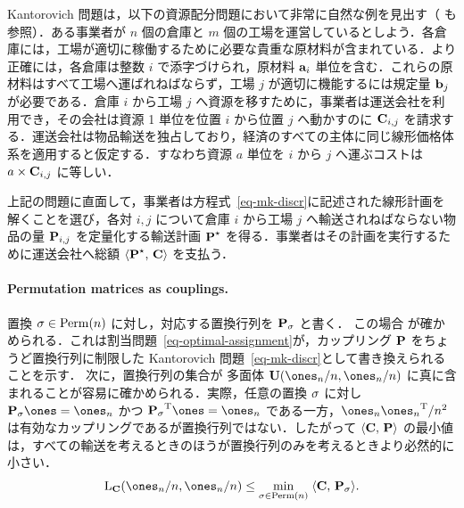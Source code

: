 \begin{rem}[鉱山と工場]\label{rem-kantorovich-primal} Kantorovich 問題は，以下の資源配分問題において非常に自然な例を見出す（\citet{Hitchcock41} も参照）．ある事業者が $n$ 個の倉庫と $m$ 個の工場を運営しているとしよう．各倉庫には，工場が適切に稼働するために必要な貴重な原材料が含まれている．より正確には，各倉庫は整数 $i$ で添字づけられ，原材料 $\a_i$ 単位を含む．これらの原材料はすべて工場へ運ばれねばならず，工場 $j$ が適切に機能するには規定量 $\b_j$ が必要である．倉庫 $i$ から工場 $j$ へ資源を移すために，事業者は運送会社を利用でき，その会社は資源 1 単位を位置 $i$ から位置 $j$ へ動かすのに $\C_{i,j}$ を請求する．運送会社は物品輸送を独占しており，経済のすべての主体に同じ線形価格体系を適用すると仮定する．すなわち資源 $a$ 単位を $i$ から $j$ へ運ぶコストは $a\times \C_{i,j}$ に等しい．

上記の問題に直面して，事業者は方程式~\eqref{eq-mk-discr}に記述された線形計画を解くことを選び，各対 $i,j$ について倉庫 $i$ から工場 $j$ へ輸送されねばならない物品の量 $\P_{i,j}$ を定量化する輸送計画 $\P^\star$ を得る．事業者はその計画を実行するために運送会社へ総額 $\dotp{\P^\star}{\C}$ を支払う．
\end{rem}

\paragraph{Permutation matrices as couplings.}

置換 $\si\in\Perm(n)$ に対し，対応する置換行列を $\P_{\si}$ と書く．
この場合
が確かめられる．これは割当問題~\eqref{eq-optimal-assignment}が，カップリング $\P$ をちょうど置換行列に制限した Kantorovich 問題~\eqref{eq-mk-discr}として書き換えられることを示す．
次に，置換行列の集合が \citeauthor{birkhoff} 多面体 $\CouplingsD(\ones_n/n,\ones_n/n)$ に真に含まれることが容易に確かめられる．実際，任意の置換 $\si$ に対し $\P_{\si}\ones=\ones_n$ かつ $\transp{\P_{\si}}\ones=\ones_n$ である一方，$\ones_n\transp{\ones_n}/n^2$ は有効なカップリングであるが置換行列ではない．したがって $\dotp{\C}{\P}$ の最小値は，すべての輸送を考えるときのほうが置換行列のみを考えるときより必然的に小さい．
$$ \MKD_{\C}(\ones_n/n,\ones_n/n) \leq \umin{\si \in \Perm(n)} \dotp{\C}{\P_{\si}}.$$

